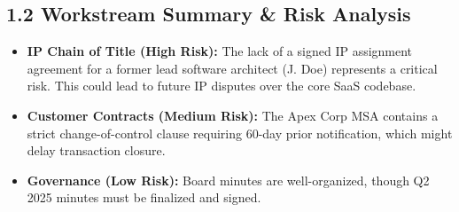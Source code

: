 \subsection{1.2 Workstream Summary \& Risk Analysis}
\begin{itemize}[leftmargin=*]
  \item \textbf{IP Chain of Title (High Risk):} The lack of a signed IP assignment agreement for a former lead software architect (J. Doe) represents a critical risk. This could lead to future IP disputes over the core SaaS codebase.
  \item \textbf{Customer Contracts (Medium Risk):} The Apex Corp MSA contains a strict change-of-control clause requiring 60-day prior notification, which might delay transaction closure.
  \item \textbf{Governance (Low Risk):} Board minutes are well-organized, though Q2 2025 minutes must be finalized and signed.
\end{itemize}
